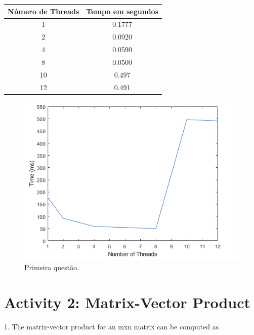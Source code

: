 \documentclass[letterpaper, 10 pt, conference]{ieeeconf}
\begin{document}
\begin{table}[H]
\begin{tabular}{|c|c|}
\hline
	Número de Threads & Tempo em segundos \\
	\hline\hline
	1 & 0.1777\\
	\hline
    2 & 0.0920\\
    \hline
    4 & 0.0590\\
    \hline
    8 & 0.0500\\
    \hline
    10 & 0.497\\
    \hline
    12 & 0.491\\
\hline
\end{tabular}
\end{table}
\begin{figure}[htbp]
\centering
\includegraphics[width=0.97\columnwidth]{Figuras/img5.png}
\caption{Primeira questão.}
\label{stability}
\end{figure}


\section{Activity 2: Matrix-Vector Product }
1. The matrix-vector product for an mxn matrix can be computed as
\end{document}
